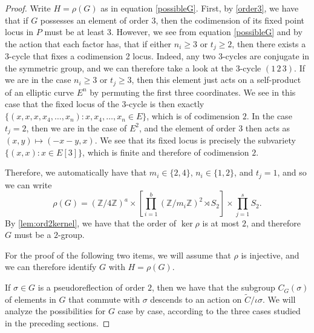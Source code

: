 \documentclass[preprint,12pt]{amsart}
\def\bZ{\ensuremath{\mathbb{Z}}}
\theoremstyle{plain}
\theoremstyle{definition}
\begin{document}
\begin{proof}
Write $H=\rho(G)$ as in equation \eqref{possibleG}. First, by \autoref{order3}, we have that if $G$ possesses an element of order $3$, then the codimension of its fixed point locus in $P$ must be at least 3. However, we see from equation \eqref{possibleG} and by the action that each factor has, that if either $n_i\geq 3$ or $t_j\geq2$, then there exists a 3-cycle that fixes a codimension 2 locus. Indeed, any two 3-cycles are conjugate in the symmetric group, and we can therefore take a look at the 3-cycle $(1\,2\,3)$. If we are in the case $n_i\geq 3$ or $t_j\geq 3$, then this element just acts on a self-product of an elliptic curve $E^n$ by permuting the first three coordinates. We see in this case that the fixed locus of the 3-cycle is then exactly $\{(x,x,x,x_4,\ldots,x_n):x,x_4,\ldots,x_n\in E\}$, which is of codimension $2$. In the case $t_j=2$, then we are in the case of $E^2$, and the element of order $3$ then acts as $(x,y)\mapsto(-x-y,x)$. We see that its fixed locus is precisely the subvariety $\{(x,x):x\in E[3]\}$, which is finite and therefore of codimension $2$.

Therefore, we automatically have that $m_i\in\{2,4\}$, $n_i\in\{1,2\}$, and $t_j=1$, and so we can write
\[\rho(G)=(\bZ/4\bZ)^a\times\left[\prod_{i=1}^b(\bZ/m_i\bZ)^{2}\rtimes S_{2}\right]\times\prod_{j=1}^sS_{2}.\]
By \autoref{lem:ord2kernel}, we have that the order of $\ker\rho$ is at most $2$, and therefore $G$ must be a $2$-group.

For the proof of the following two items, we will assume that $\rho$ is injective, and we can therefore identify $G$ with $H=\rho(G)$.

If $\sigma\in G$ is a pseudoreflection of order $2$, then we have that the subgroup $C_G(\sigma)$ of elements in $G$ that commute with $\sigma$ descends to an action on $\tilde{C}/\iota\sigma$. We will analyze the possibilities for $G$ case by case, according to the three cases studied in the preceding sections.


\end{proof}
\end{document}
